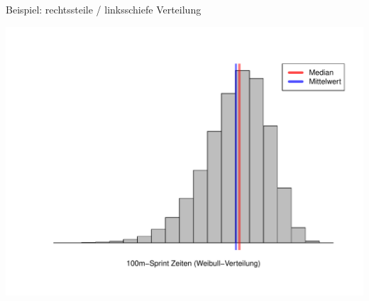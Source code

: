 \documentclass[t,11pt,aspectratio=169]{beamer}
\begin{document}
\begin{frame}
	Beispiel: rechtssteile / linksschiefe Verteilung
	\vspace{-0.7cm}
	\begin{center}
		\includegraphics[scale=0.5]{3.pdf}
	\end{center}
\end{frame}
\end{document}

